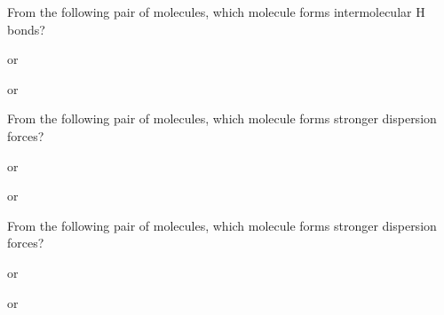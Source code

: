 \documentclass[main.tex]{subfiles}
\begin{document}
\begin{multicols*}{2}
\begin{question}[ID=\the\value{numA}]
From the following pair of molecules, which molecule forms intermolecular H bonds?
\begin{inparaenum}[(a)]
\item {} or 
\item {} or 
\end{inparaenum}
\end{question}
\begin{solution}
\begin{inparaenum}[(a)]
\item {}
\item	{}
\end{inparaenum}\hspace{0.1cm}\end{solution}

\begin{question}[ID=\the\value{numA}]
From the following pair of molecules, which molecule forms stronger dispersion forces?
\begin{inparaenum}[(a)]
\item {} or 
\item  {} or  
\end{inparaenum}
\end{question}
\begin{solution}
\begin{inparaenum}[(a)]
\item  {}
\item {}
\end{inparaenum}\hspace{0.1cm}\end{solution}

\begin{question}[ID=\the\value{numA}]
From the following pair of molecules, which molecule forms stronger dispersion forces?
\begin{inparaenum}[(a)]
\item   {} or  
\item   {} or  
\end{inparaenum}
\end{question}
\begin{solution}
\begin{inparaenum}[(a)]
\item {}
\item	 {}
\end{inparaenum}\hspace{0.1cm}\end{solution}


\end{multicols*}
\end{document}
